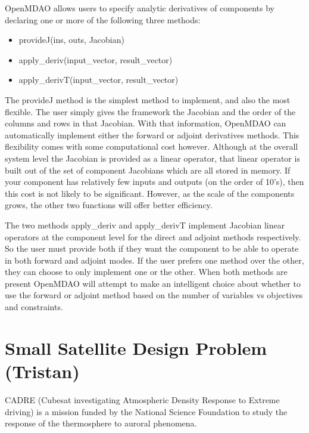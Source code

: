 \documentclass[]{aiaa-tc} %
\begin{document}
        OpenMDAO allows users to specify analytic derivatives of components by declaring one or more of the following three
        methods:

        \begin{itemize}
            \item provideJ(ins, outs, Jacobian)
            \item apply\_deriv(input\_vector, result\_vector)
            \item apply\_derivT(input\_vector, result\_vector)
        \end{itemize}

        The provideJ method is the simplest method to implement, and also the most flexible. The user simply gives the framework the
        Jacobian and the order of the columns and rows in that Jacobian. With that information, OpenMDAO can automatically
        implement either the forward or adjoint derivatives methods. This flexibility comes with some computational cost however.
        Although at the overall system level the Jacobian is provided as a linear operator, that linear operator is built out
        of the set of component Jacobians which are all stored in memory. If your component has relatively few inputs and outputs
        (on the order of 10's), then this cost is not likely to be significant. However, as the scale of the components grows,
        the other two functions will offer better efficiency.

        The two methods apply\_deriv and apply\_derivT implement Jacobian linear operators at
        the component level for the direct and adjoint methods respectively. So the user must provide both if they
        want the component to be able to operate in both forward and adjoint modes. If the user prefers one method over
        the other, they can choose to only implement one or the other. When both methods are present OpenMDAO will
        attempt to make an intelligent choice about whether to use the forward or adjoint method based on the number
        of variables vs objectives and constraints.



  \section{Small Satellite Design Problem (Tristan)}

  CADRE (Cubesat investigating Atmospheric Density Response to Extreme driving)
  is a mission funded by the National Science Foundation to study the
  response of the thermosphere to auroral phenomena\cite{cutler2011cubesat}.
\end{document}
